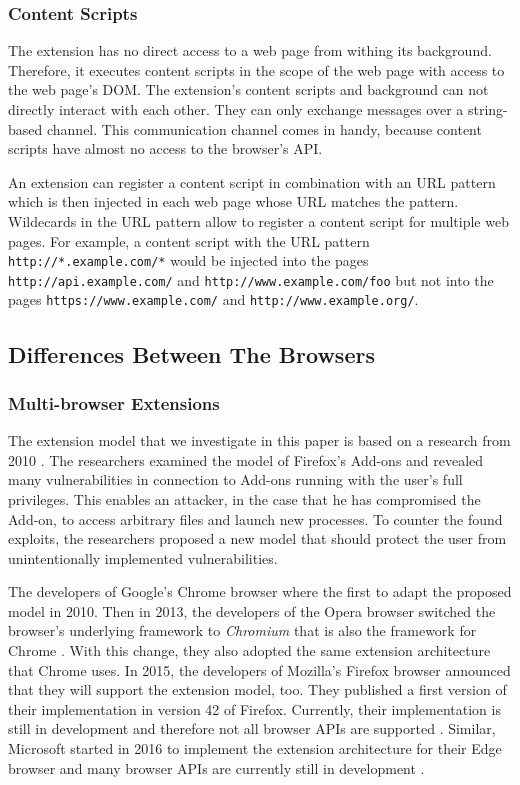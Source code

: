 \subsubsection{Content Scripts}

	The extension has no direct access to a web page from withing its background. Therefore, it executes content scripts in the scope of the web page with access to the web page's DOM. The extension's content scripts and background can not directly interact with each other. They can only exchange messages over a string-based channel. This communication channel comes in handy, because content scripts have almost no access to the browser's API. 
	
	An extension can register a content script in combination with an URL pattern which is then injected in each web page whose URL matches the pattern. Wildecards in the URL pattern allow to register a content script for multiple web pages. For example, a content script with the URL pattern \texttt{http://*.example.com/*} would be injected into the pages \texttt{http://api.example.com/} and \texttt{http://www.example.com/foo} but not into the pages \texttt{https://www.example.com/} and \texttt{http://www.example.org/}.



\subsection{Differences Between The Browsers}

			
	
\subsubsection{Multi-browser Extensions}

	The extension model that we investigate in this paper is based on a research from 2010 \cite{Barth10protectingbrowsers}. The researchers examined the model of Firefox's Add-ons and revealed many vulnerabilities in connection to Add-ons running with the user's full privileges. This enables an attacker, in the case that he has compromised the Add-on, to access arbitrary files and launch new processes. To counter the found exploits, the researchers proposed a new model that should protect the user from unintentionally implemented vulnerabilities.
	
	The developers of Google's Chrome browser where the first to adapt the proposed model in 2010. Then in 2013, the developers of the Opera browser switched the browser's underlying framework to \textit{Chromium} that is also the framework for Chrome \cite{operaBlogSwitchToChromium}. With this change, they also adopted the same extension architecture that Chrome uses. In 2015, the developers of Mozilla's Firefox browser announced that they will support the extension model, too. They published a first version of their implementation in version 42 of Firefox. Currently, their implementation is still in development and therefore not all browser APIs are supported \cite{mozillaWebExtensionStatus}. Similar, Microsoft started in 2016 to implement the extension architecture for their Edge browser and many browser APIs are currently still in development \cite{edgeBrowserApiStatus}.
		
